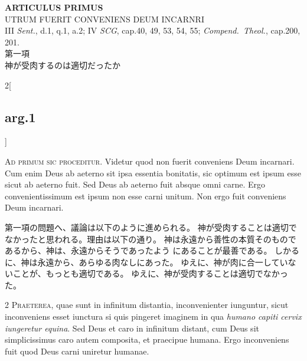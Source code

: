 \documentclass[paper=a4paper,fontsize=10pt,jafontsize=9pt,titlepage]{jlreq}
\begin{document}
\newpage
{}
{}
\setcounter{section}{1}
\setcounter{subsection}{0}



\begin{center}
 {\Large {\bfseries ARTICULUS PRIMUS}}\\
 {\large UTRUM FUERIT CONVENIENS DEUM INCARNRI}\\
 {\footnotesize III {\itshape Sent.}, d.1, q.1, a.2; IV {\itshape SCG},
 cap.40, 49, 53, 54, 55; {\itshape Compend.~Theol.}, cap.200, 201.}\\
 {\Large 第一項\\神が受肉するのは適切だったか}
\end{center}


\begin{paracol}{2}[\subsection{arg.1}]

{\Huge A}{\scshape d primum sic proceditur}. Videtur quod non fuerit conveniens Deum
incarnari. Cum enim Deus ab aeterno sit ipsa essentia bonitatis, sic
optimum est ipsum esse sicut ab aeterno fuit. Sed Deus ab aeterno fuit
absque omni carne. Ergo convenientissimum est ipsum non esse carni
unitum. Non ergo fuit conveniens Deum incarnari.

\switchcolumn

第一項の問題へ、議論は以下のように進められる。
神が受肉することは適切でなかったと思われる。理由は以下の通り。
神は永遠から善性の本質そのものであるから、神は、永遠からそうであったよう
 にあることが最善である。
しかるに、神は永遠から、あらゆる肉なしにあった。
ゆえに、神が肉に合一していないことが、もっとも適切である。
ゆえに、神が受肉することは適切でなかった。


2 {\scshape Praeterea}, quae sunt in infinitum distantia, inconvenienter iunguntur,
sicut inconveniens esset iunctura si quis pingeret imaginem in qua
{\itshape humano capiti cervix iungeretur equina}. Sed Deus et caro in infinitum
distant, cum Deus sit simplicissimus caro autem composita, et praecipue
humana. Ergo inconveniens fuit quod Deus carni uniretur humanae.

\switchcolumn


\end{paracol}
\end{document}
